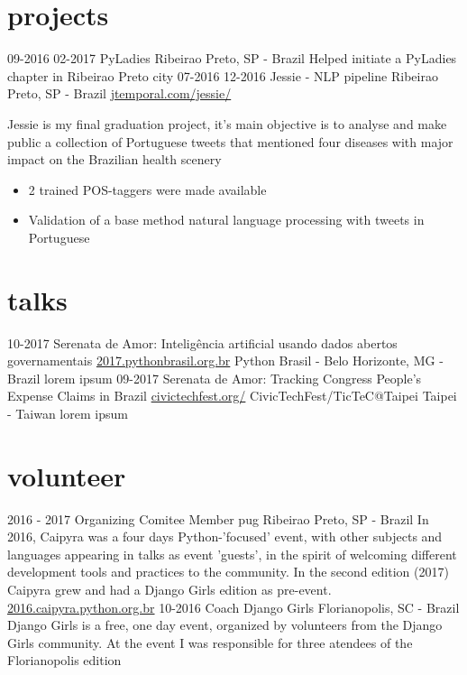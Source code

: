 \documentclass[]{friggeri-cv}
\begin{document}
\section{projects}

\begin{entrylist}
  \entry
    {09-2016 02-2017}
    {PyLadies}
    {Ribeirao Preto, SP - Brazil}
    {Helped initiate a PyLadies chapter in Ribeirao Preto city}
  \entrysecondtype
    {07-2016 12-2016}
    {Jessie - NLP pipeline}
    {Ribeirao Preto, SP - Brazil}
    {\href{http://jtemporal.com/jessie/}{jtemporal.com/jessie/}}
    {Jessie is my final graduation project, it's main objective is to analyse and make public a collection of Portuguese tweets that mentioned four diseases with major impact on the Brazilian health scenery
      \begin{itemize}
        \item 2 trained POS-taggers were made available
        \item Validation of a base method natural language processing with tweets in Portuguese
      \end{itemize}
    }
\end{entrylist}

\section{talks}

\begin{entrylist}
  \talkentry
    {10-2017}
    {Serenata de Amor: Inteligência artificial usando dados abertos governamentais}
    {\href{http://2017.pythonbrasil.org.br/}{2017.pythonbrasil.org.br}}
    {Python Brasil - Belo Horizonte, MG - Brazil}
    {lorem ipsum}
  \talkentry
    {09-2017}
    {Serenata de Amor: Tracking Congress People's Expense Claims in Brazil}
    {\href{http://civictechfest.org/}{civictechfest.org/}}
    {CivicTechFest/TicTeC@Taipei Taipei - Taiwan}
    {lorem ipsum}
\end{entrylist}

\section{volunteer}

\begin{entrylist}
  \entry
    {2016 - 2017}
    {Organizing Comitee Member}
    {pug Ribeirao Preto, SP - Brazil}
    {In 2016, Caipyra was a four days Python-'focused' event, with other subjects and languages appearing in talks as event 'guests', in the spirit of welcoming different development tools and practices to the community. In the second edition (2017) Caipyra grew and had a Django Girls edition as pre-event. \footnotesize\href{2016.caipyra.python.org.br}{2016.caipyra.python.org.br}}
  \entry
    {10-2016}
    {Coach}
    {Django Girls Florianopolis, SC - Brazil}
    {Django Girls is a free, one day event, organized by volunteers  from the Django Girls community. At the event I was responsible for three atendees of the Florianopolis edition}
\end{entrylist}
\end{document}
